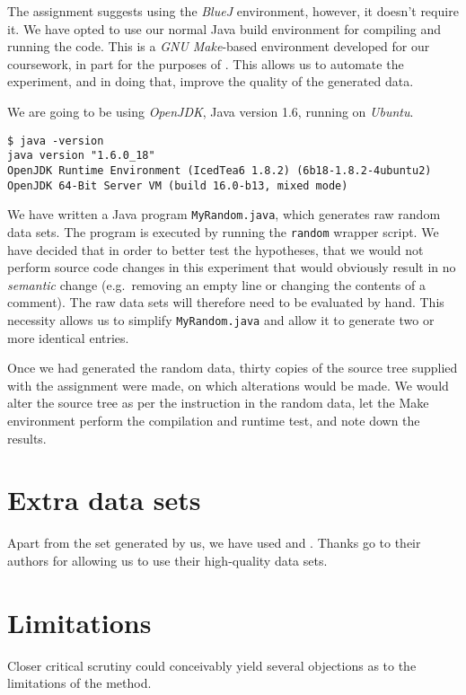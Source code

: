 \documentclass[10pt]{report}
\begin{document}
The assignment suggests using the {\em BlueJ} environment, however, it doesn't require it.  We have opted to use our normal Java build environment for compiling and running the code.  This is a {\em GNU Make}-based environment developed for our coursework, in part for the purposes of \cite{minar}.  This allows us to automate the experiment, and in doing that, improve the quality of the generated data.

We are going to be using {\em OpenJDK}, Java version 1.6, running on {\em Ubuntu}.
\begin{verbatim}
$ java -version
java version "1.6.0_18"
OpenJDK Runtime Environment (IcedTea6 1.8.2) (6b18-1.8.2-4ubuntu2)
OpenJDK 64-Bit Server VM (build 16.0-b13, mixed mode)
\end{verbatim}

We have written a Java program {\tt MyRandom.java}, which generates raw random data sets.  The program is executed by running the {\tt random} wrapper script.
We have decided that in order to better test the hypotheses, that we would not perform source code changes in this experiment that would obviously result in no {\em semantic} change (e.g.~removing an empty line or changing the contents of a comment).  The raw data sets will therefore need to be evaluated by hand.  This necessity allows us to simplify {\tt MyRandom.java} and allow it to generate two or more identical entries.

Once we had generated the random data, thirty copies of the source tree supplied with the assignment were made, on which alterations would be made.  We would alter the source tree as per the instruction in the random data, let the Make environment perform the compilation and runtime test, and note down the results.

\section{Extra data sets}

Apart from the set generated by us, we have used \cite{hoad} and \cite{nugee}.  Thanks go to their authors for allowing us to use their high-quality data sets.

\section{Limitations}

Closer critical scrutiny could conceivably yield several objections as to the limitations of the method.
\end{document}

